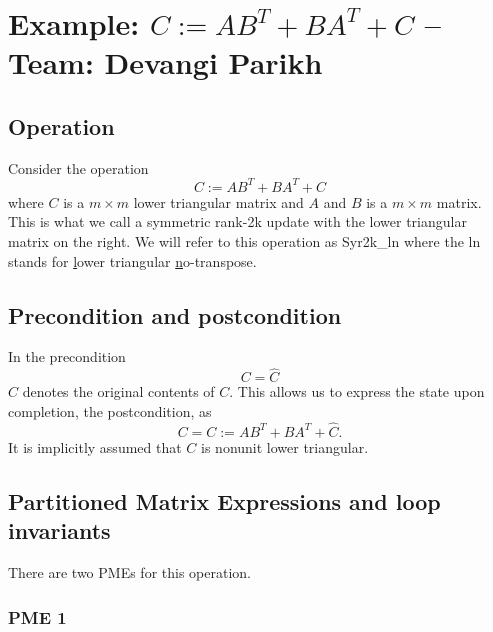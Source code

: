 \chapter{Example: $ C := A B ^ T + B A ^ T + C $ --  \large Team: Devangi Parikh}



\section{Operation}

Consider the operation
\[
C := A B ^ T + B A ^ T + C
\]
where $ C $ is a $ m \times m $ lower triangular matrix and $ A $ and $ B $ is a $ m \times m $ matrix.
This is what we call a symmetric rank-2k update
with the {\sc l}ower triangular matrix on the {\sc r}ight.
We will refer to this operation
as {\sc Syr2k\_ln} where the {\sc ln} stands for
\underline{l}ower triangular
\underline{n}o-transpose.

\section{Precondition and postcondition}

In the precondition 
\[
C = \widehat C
\]
$ \widehat C $ denotes the original contents of $ C $.
This allows us to express the state upon completion, the postcondition, as
\[
C = C := A B ^ T + B A ^ T + \widehat C.
\]
It is implicitly assumed that $ C $ is nonunit lower triangular.
\section{Partitioned Matrix Expressions and loop invariants}

There are two PMEs for this operation.

\subsection{PME 1}

